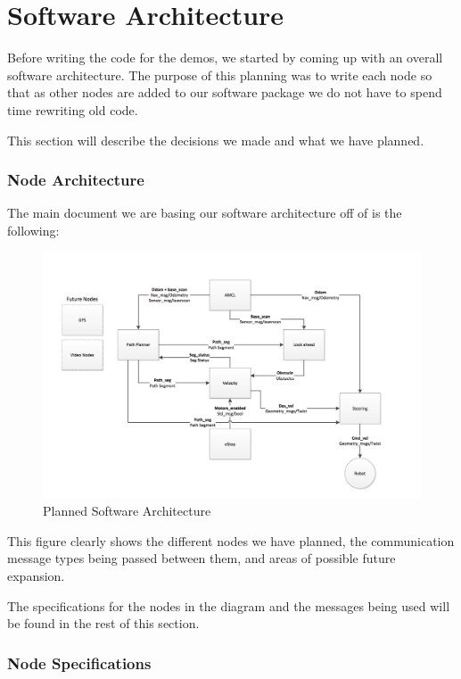 \part{Software Architecture}

Before writing the code for the demos, we started by coming up with an
overall software architecture.  The purpose of this planning was to
write each node so that as other nodes are added to our software
package we do not have to spend time rewriting old code.

This section will describe the decisions we made and what we have
planned.

\section{Node Architecture}

The main document we are basing our software architecture off of is
the following:

\FloatBarrier
\begin{figure}[h]
  \includegraphics[width=8.0in]{software_architecture_diagram}
  \caption{Planned Software Architecture}
\end{figure}
\FloatBarrier

This figure clearly shows the different nodes we have planned, the
communication message types being passed between them, and areas of
possible future expansion.

The specifications for the nodes in the diagram and the messages being
used will be found in the rest of this section.



\section{Node Specifications}

